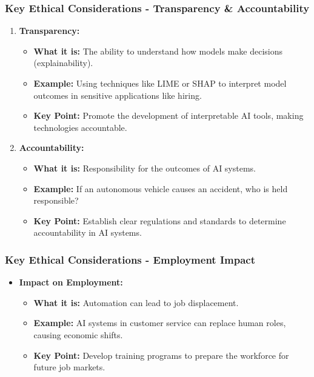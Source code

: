 \documentclass[aspectratio=169]{beamer}
\begin{document}
\begin{frame}[fragile]
    \frametitle{Key Ethical Considerations - Transparency & Accountability}
    \begin{enumerate}[resume]
        \item \textbf{Transparency:}
        \begin{itemize}
            \item \textbf{What it is:} The ability to understand how models make decisions (explainability).
            \item \textbf{Example:} Using techniques like LIME or SHAP to interpret model outcomes in sensitive applications like hiring.
            \item \textbf{Key Point:} Promote the development of interpretable AI tools, making technologies accountable.
        \end{itemize}
        
        \item \textbf{Accountability:}
        \begin{itemize}
            \item \textbf{What it is:} Responsibility for the outcomes of AI systems.
            \item \textbf{Example:} If an autonomous vehicle causes an accident, who is held responsible?
            \item \textbf{Key Point:} Establish clear regulations and standards to determine accountability in AI systems.
        \end{itemize}
    \end{enumerate}
\end{frame}

\begin{frame}[fragile]
    \frametitle{Key Ethical Considerations - Employment Impact}
    \begin{itemize}
        \item \textbf{Impact on Employment:}
        \begin{itemize}
            \item \textbf{What it is:} Automation can lead to job displacement.
            \item \textbf{Example:} AI systems in customer service can replace human roles, causing economic shifts.
            \item \textbf{Key Point:} Develop training programs to prepare the workforce for future job markets.
        \end{itemize}
    \end{itemize}
\end{frame}
\end{document}
